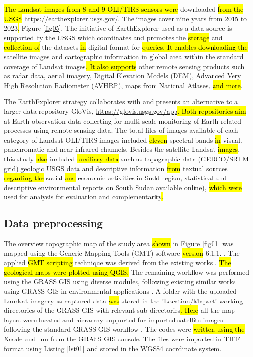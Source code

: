 \documentclass[sustainability,article,submit,pdftex,moreauthors]{Definitions/mdpi}
\begin{document}
\hl{The Landsat images from 8 and 9 OLI/TIRS sensors were} downloaded \hl{from the USGS} \href{https://earthexplorer.usgs.gov/}{https://earthexplorer.usgs.gov/}. The images cover nine years from 2015 to 2023\hl{, }Figure \ref{fig05}. The initiative of EarthExplorer used as a data source is supported by the USGS which coordinates and promotes the \hl{storage} and \hl{collection of }the datasets \hl{in} digital\hl{ }format for \hl{queries. It enables downloading the }satellite images and cartographic information in\hl{ }global area within the standard coverage of Landsat images\hl{. It also supports }other remote sensing products such as radar data, aerial imagery, Digital Elevation Models (DEM), Advanced Very High Resolution Radiometer (AVHRR), maps from National Atlases, \hl{and more}. 

The EarthExplorer strategy collaborates with and presents an alternative to a larger data repository GloVis, \href{https://glovis.usgs.gov/app}{https://glovis.usgs.gov/app}\hl{. Both repositories aim} at Earth observation data collecting for multi-scale monitoring of Earth-related processes using remote sensing data. The total files of images available of each category of Landsat OLI/TIRS images included \hl{eleven} spectral bands \hl{in} visual, panchromatic and near-infrared channels. Besides the\hl{ }satellite Landsat \hl{images}, this study \hl{also }included\hl{ auxiliary data }such as\hl{ }topographic data (GEBCO/SRTM grid) geologic USGS data and\hl{ }descriptive information \hl{from }textual sources \hl{regarding the }social \hl{and }economic activities in Sudd region, statistical and descriptive environmental reports on South Sudan available online), \hl{which were }used for analysis for evaluation and complementarity\hl{.}

\subsection{Data preprocessing}
The overview topographic map of the study area \hl{shown} in Figure \ref{fig01} was mapped using the Generic Mapping Tools (GMT) software \hl{version} 6.1.1. \cite{Wessel}. The applied \hl{GMT scripting }technique was derived from the existing works \cite{Lemenkova202203,data7060074}. \hl{The geological maps were plotted using QGIS. }The remaining workflow was performed using the GRASS GIS using diverse modules, following existing similar works using GRASS GIS in environmental applications \cite{HOFIERKA201720,JASIEWICZ20111162,JASIEWICZ20111525,SOROKINE2007685}. A folder with the uploaded Landsat imagery as captured data \hl{was} stored in the 'Location/Mapset' working directories of the GRASS GIS with relevant sub-directories\hl{. Here }all the map layers were located\hl{ }and hierarchy supported for imported satellite images following the standard GRASS GIS workflow \cite{NETELER2012124}. The codes were \hl{written using the }Xcode and run from the GRASS GIS console. The files were imported in TIFF format using Listing \ref{lst01} and stored in the WGS84 coordinate system. 
\end{document}
